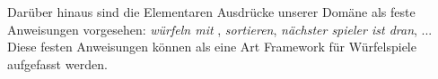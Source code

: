 Darüber hinaus sind die Elementaren Ausdrücke unserer Domäne als feste Anweisungen vorgesehen: \emph{würfeln mit }, \emph{sortieren}, \emph{nächster spieler ist dran}, ... Diese festen Anweisungen können als eine Art Framework für Würfelspiele aufgefasst werden.







